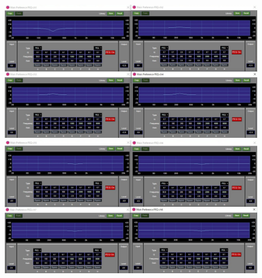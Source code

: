 \documentclass[11pt,a4j]{jreport}
\begin{document}
\newpage
{}
\begin{figure}[H]
  \begin{minipage}[b]{.5\linewidth}
    \centering
    \includegraphics[width=.9\linewidth]{images/experimentField/afcParameters/02beta/05manualEQ6.jpg}
  \end{minipage}%
  \begin{minipage}[b]{.5\linewidth}
    \centering
    \includegraphics[width=.9\linewidth]{images/experimentField/afcParameters/02beta/05manualEQ7.jpg}
  \end{minipage}


\end{figure}
\end{document}
